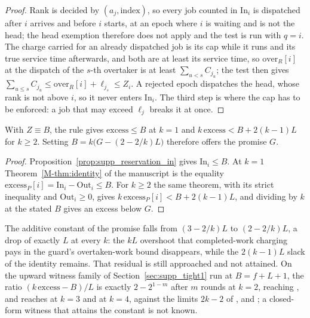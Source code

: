 \begin{proof}
Rank is decided by $(a_j,\text{index})$, so every job counted in $\mathrm{In}_i$ is
dispatched after $i$ arrives and before $i$ starts, at an epoch where $i$ is waiting and
is not the head; the head exemption therefore does not apply and the test is run with
$q=i$. The charge carried for an already dispatched job is its cap while it runs and its
true service time afterwards, and both are at least its service time, so
$\mathrm{over}_R[i]$ at the dispatch of the $s$-th overtaker is at least
$\sum_{u<s}C_{j_u}$; the test then gives
$\sum_{u\le s}C_{j_u} \le \mathrm{over}_R[i]+\ell_{j_s} \le Z_i$. A rejected epoch
dispatches the head, whose rank is not above $i$, so it never enters $\mathrm{In}_i$. The
third step is where the cap has to be enforced: a job that may exceed $\ell_j$ breaks it
at once.
\end{proof}

\begin{proposition}
\label{prop:supp_reservation_promise}
With $Z \equiv B$, the rule gives $\mathrm{excess} \le B$ at $k=1$ and
$k\,\mathrm{excess} < B+2(k-1)L$ for $k \ge 2$. Setting
$B = k\bigl(G-(2-2/k)L\bigr)$ therefore offers the promise $G$.
\end{proposition}

\begin{proof}
Proposition~\ref{prop:supp_reservation_in} gives $\mathrm{In}_i\leq B$. At $k=1$
Theorem~\ref*{M-thm:identity} of the manuscript is the equality
$\mathrm{excess}_P[i]=\mathrm{In}_i-\mathrm{Out}_i\leq B$. For $k\geq2$ the same theorem,
with its strict inequality and $\mathrm{Out}_i\geq0$, gives
$k\,\mathrm{excess}_P[i]<B+2(k-1)L$, and dividing by $k$ at the stated $B$ gives an excess
below $G$.
\end{proof}

The additive constant of the promise falls from $(3-2/k)L$ to $(2-2/k)L$, a drop of
exactly $L$ at every $k$: the $kL$ overshoot that completed-work charging pays in the
guard's overtaken-work bound disappears, while the $2(k-1)L$ slack of the identity
remains. That residual is still approached and not attained. On the upward witness family of
Section~\ref{sec:supp_tight1} run at $B=f+L+1$, the ratio $(k\,\mathrm{excess}-B)/L$ is exactly
$2-2^{1-m}$ after $m$ rounds at $k=2$, reaching , and reaches
 at $k=3$ and  at $k=4$, against the limits $2k-2$ of
,  and ; a closed-form witness that attains the constant is
not known.

